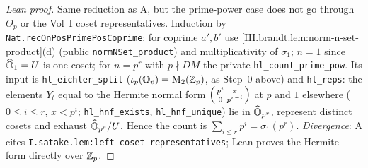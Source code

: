 \begin{proof}[Lean proof]
Same reduction as A, but the prime-power case does not go through $\Theta_p$ or the Vol~I coset representatives. Induction by \texttt{Nat.recOnPosPrimePosCoprime}: for coprime $a',b'$ use \cref{III.brandt.lem:norm-n-set-product}(d) (public \texttt{normNSet\_product}) and multiplicativity of $\sigma_1$; $n=1$ since $\widehat{\mathbb{O}}_1=U$ is one coset; for $n=p^r$ with $p\nmid DM$ the private \texttt{hl\_count\_prime\_pow}. Its input is \texttt{hl\_eichler\_split} ($\iota_p(\mathbb{O}_p)=\mathrm{M}_2(\mathbb{Z}_p)$, as Step~0 above) and \texttt{hl\_reps}: the elements $Y_t$ equal to the Hermite normal form $\begin{psmallmatrix}p^i&x\\0&p^{r-i}\end{psmallmatrix}$ at $p$ and $1$ elsewhere ($0\le i\le r$, $x<p^i$; \texttt{hl\_hnf\_exists}, \texttt{hl\_hnf\_unique}) lie in $\widehat{\mathbb{O}}_{p^r}$, represent distinct cosets and exhaust $\widehat{\mathbb{O}}_{p^r}/U$. Hence the count is $\sum_{i\le r}p^i=\sigma_1(p^r)$. \emph{Divergence}: A cites \texttt{I.satake.lem:left-coset-representatives}; Lean proves the Hermite form directly over $\mathbb{Z}_p$.
\end{proof}

